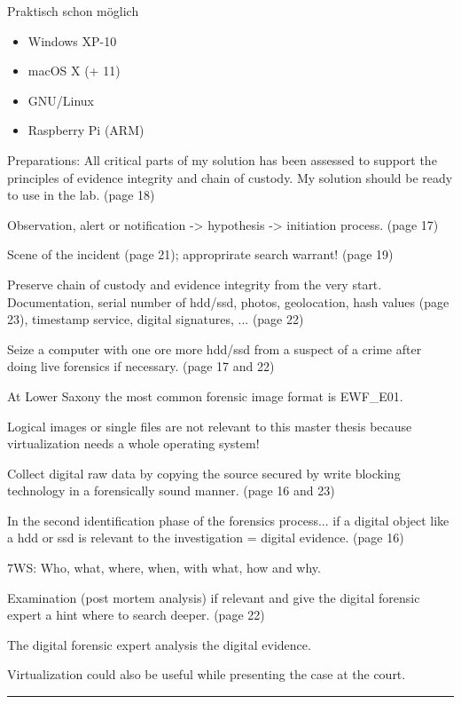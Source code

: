 Praktisch schon möglich
\begin{itemize}
\item Windows XP-10
\item macOS X (+ 11)
\item GNU/Linux
\item Raspberry Pi (ARM)
\end{itemize}

\noindent Preparations: All critical parts of my solution has been assessed to support the principles of evidence integrity and chain of custody. My solution should be ready to use in the lab. (page 18)

Observation, alert or notification -> hypothesis -> initiation process. (page 17)

Scene of the incident (page 21); approprirate search warrant! (page 19)

Preserve chain of custody and evidence integrity from the very start. Documentation, serial number of hdd/ssd, photos, geolocation, hash values (page 23), timestamp service, digital signatures, ... (page 22)

Seize a computer with one ore more hdd/ssd from a suspect of a crime after doing live forensics if necessary. (page 17 and 22)

At Lower Saxony the most common forensic image format is EWF\_E01.

Logical images or single files are not relevant to this master thesis because virtualization needs a whole operating system!

Collect digital raw data by copying the source secured by write blocking technology in a forensically sound manner. (page 16 and 23)

In the second identification phase of the forensics process... if a digital object like a hdd or ssd is relevant to the investigation = digital evidence. (page 16)

7WS: Who, what, where, when, with what, how and why.

Examination (post mortem analysis) if relevant and give the  digital forensic expert a hint where to search deeper. (page 22)

The digital forensic expert analysis the digital evidence.

Virtualization could also be useful while presenting the case at the court.

\noindent\rule{\textwidth}{1pt}


